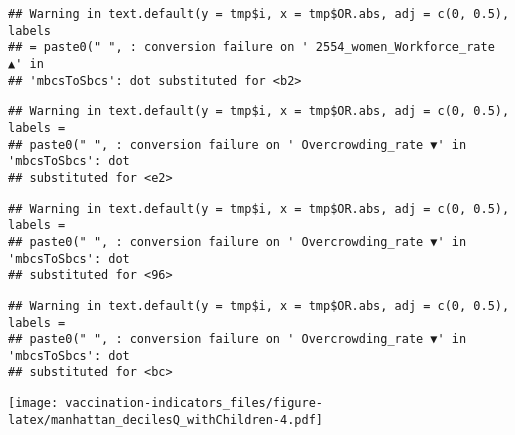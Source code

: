 \documentclass[
]{article}
\newenvironment{Shaded}{\begin{snugshade}}{\end{snugshade}}
\newcommand{\AttributeTok}[1]{\textcolor[rgb]{0.77,0.63,0.00}{#1}}
\newcommand{\DecValTok}[1]{\textcolor[rgb]{0.00,0.00,0.81}{#1}}
\newcommand{\FunctionTok}[1]{\textcolor[rgb]{0.00,0.00,0.00}{#1}}
\newcommand{\NormalTok}[1]{#1}
\newcommand{\OtherTok}[1]{\textcolor[rgb]{0.56,0.35,0.01}{#1}}
\newcommand{\SpecialCharTok}[1]{\textcolor[rgb]{0.00,0.00,0.00}{#1}}
\newcommand{\StringTok}[1]{\textcolor[rgb]{0.31,0.60,0.02}{#1}}
\begin{document}
\begin{verbatim}
## Warning in text.default(y = tmp$i, x = tmp$OR.abs, adj = c(0, 0.5), labels
## = paste0(" ", : conversion failure on ' 2554_women_Workforce_rate ▲' in
## 'mbcsToSbcs': dot substituted for <b2>
\end{verbatim}

\begin{verbatim}
## Warning in text.default(y = tmp$i, x = tmp$OR.abs, adj = c(0, 0.5), labels =
## paste0(" ", : conversion failure on ' Overcrowding_rate ▼' in 'mbcsToSbcs': dot
## substituted for <e2>
\end{verbatim}

\begin{verbatim}
## Warning in text.default(y = tmp$i, x = tmp$OR.abs, adj = c(0, 0.5), labels =
## paste0(" ", : conversion failure on ' Overcrowding_rate ▼' in 'mbcsToSbcs': dot
## substituted for <96>
\end{verbatim}

\begin{verbatim}
## Warning in text.default(y = tmp$i, x = tmp$OR.abs, adj = c(0, 0.5), labels =
## paste0(" ", : conversion failure on ' Overcrowding_rate ▼' in 'mbcsToSbcs': dot
## substituted for <bc>
\end{verbatim}

\texttt{[image: vaccination-indicators\_files/figure-latex/manhattan\_decilesQ\_withChildren-4.pdf]}

\begin{Shaded}
\end{Shaded}
\end{document}
